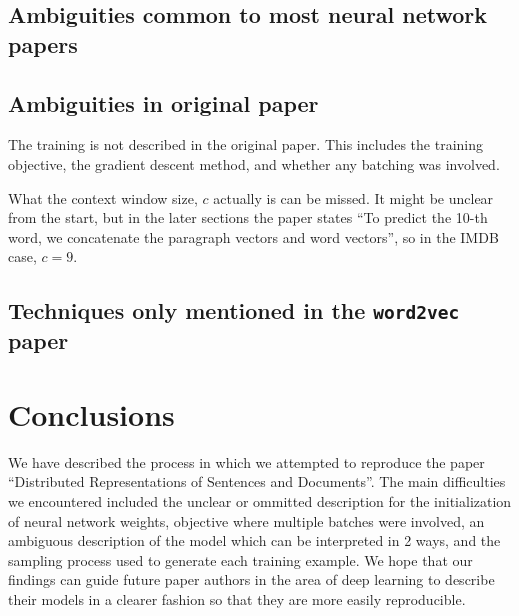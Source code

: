 \documentclass{article}
\begin{document}
\subsection{Ambiguities common to most neural network papers}

\subsection{Ambiguities in original paper}
The training is not described in the original paper. This includes the training objective, the gradient descent method, and whether any batching was involved.

What the context window size, $c$ actually is can be missed. It might be unclear from the start, but in the later sections the paper states ``To predict the 10-th word, we concatenate the paragraph vectors and word vectors'', so in the IMDB case, $c=9$.

\subsection{Techniques only mentioned in the \texttt{word2vec} paper}

\section{Conclusions}
We have described the process in which we attempted to reproduce the paper ``Distributed Representations of Sentences and Documents''. The main difficulties we encountered included the unclear or ommitted description for the initialization of neural network weights, objective where multiple batches were involved, an ambiguous description of the model which can be interpreted in 2 ways, and the sampling process used to generate each training example. We hope that our findings can guide future paper authors in the area of deep learning to describe their models in a clearer fashion so that they are more easily reproducible.
\end{document}
